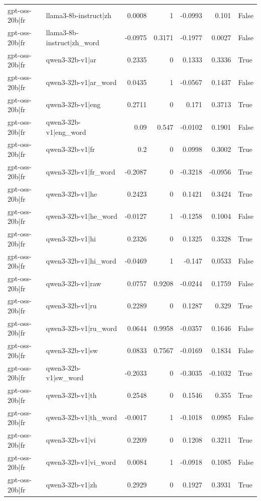 \begin{table}
\begin{tabular}{l l r r r r l}
gpt-oss-20b|fr & llama3-8b-instruct|zh & 0.0008 & 1 & -0.0993 & 0.101 & False \\
gpt-oss-20b|fr & llama3-8b-instruct|zh_word & -0.0975 & 0.3171 & -0.1977 & 0.0027 & False \\
gpt-oss-20b|fr & qwen3-32b-v1|ar & 0.2335 & 0 & 0.1333 & 0.3336 & True \\
gpt-oss-20b|fr & qwen3-32b-v1|ar_word & 0.0435 & 1 & -0.0567 & 0.1437 & False \\
gpt-oss-20b|fr & qwen3-32b-v1|eng & 0.2711 & 0 & 0.171 & 0.3713 & True \\
gpt-oss-20b|fr & qwen3-32b-v1|eng_word & 0.09 & 0.547 & -0.0102 & 0.1901 & False \\
gpt-oss-20b|fr & qwen3-32b-v1|fr & 0.2 & 0 & 0.0998 & 0.3002 & True \\
gpt-oss-20b|fr & qwen3-32b-v1|fr_word & -0.2087 & 0 & -0.3218 & -0.0956 & True \\
gpt-oss-20b|fr & qwen3-32b-v1|he & 0.2423 & 0 & 0.1421 & 0.3424 & True \\
gpt-oss-20b|fr & qwen3-32b-v1|he_word & -0.0127 & 1 & -0.1258 & 0.1004 & False \\
gpt-oss-20b|fr & qwen3-32b-v1|hi & 0.2326 & 0 & 0.1325 & 0.3328 & True \\
gpt-oss-20b|fr & qwen3-32b-v1|hi_word & -0.0469 & 1 & -0.147 & 0.0533 & False \\
gpt-oss-20b|fr & qwen3-32b-v1|raw & 0.0757 & 0.9208 & -0.0244 & 0.1759 & False \\
gpt-oss-20b|fr & qwen3-32b-v1|ru & 0.2289 & 0 & 0.1287 & 0.329 & True \\
gpt-oss-20b|fr & qwen3-32b-v1|ru_word & 0.0644 & 0.9958 & -0.0357 & 0.1646 & False \\
gpt-oss-20b|fr & qwen3-32b-v1|sw & 0.0833 & 0.7567 & -0.0169 & 0.1834 & False \\
gpt-oss-20b|fr & qwen3-32b-v1|sw_word & -0.2033 & 0 & -0.3035 & -0.1032 & True \\
gpt-oss-20b|fr & qwen3-32b-v1|th & 0.2548 & 0 & 0.1546 & 0.355 & True \\
gpt-oss-20b|fr & qwen3-32b-v1|th_word & -0.0017 & 1 & -0.1018 & 0.0985 & False \\
gpt-oss-20b|fr & qwen3-32b-v1|vi & 0.2209 & 0 & 0.1208 & 0.3211 & True \\
gpt-oss-20b|fr & qwen3-32b-v1|vi_word & 0.0084 & 1 & -0.0918 & 0.1085 & False \\
gpt-oss-20b|fr & qwen3-32b-v1|zh & 0.2929 & 0 & 0.1927 & 0.3931 & True \\

\end{tabular}
\end{table}

